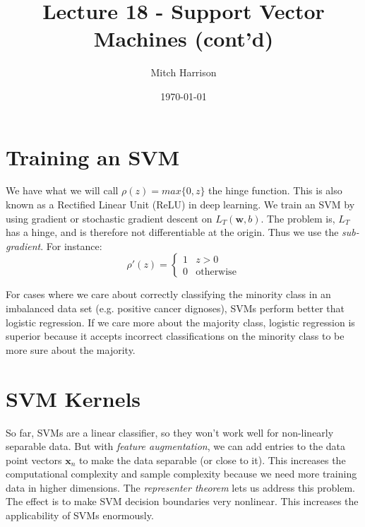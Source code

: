 \documentclass[titlepage, 12pt, leqno]{article}
\title{\Huge{Lecture 18 - Support Vector Machines (cont'd)}}
\author{\large{Mitch Harrison}}
\date{\today}
\begin{document}
\setlength{\parskip}{1\baselineskip}
\setlength{\parindent}{15pt}
\maketitle
\tableofcontents
\newpage


\section{Training an SVM}
We have what we will call $\rho(z) = max\{0,z\}$ the hinge function. This is also
known as a Rectified Linear Unit (ReLU) in deep learning. We train an SVM by
using gradient or stochastic gradient descent on $L_{T}(\textbf{w},b)$. The
problem is, $L_{T}$ has a hinge, and is therefore not differentiable at the
origin. Thus we use the \textit{sub-gradient}. For instance:
\[
\rho'(z) = 
\begin{cases}
    1 & z>0 \\
    0 & \text{otherwise}
\end{cases}
\]
\begin{note}
    For cases where we care about correctly classifying the minority class in
    an imbalanced data set (e.g. positive cancer dignoses), SVMs perform better
    that logistic regression. If we care more about the majority class,
    logistic regression is superior because it accepts incorrect classifications
    on the minority class to be more sure about the majority.
\end{note}

\pagebreak
\section{SVM Kernels}
So far, SVMs are a linear classifier, so they won't work well for non-linearly
separable data. But with \textit{feature augmentation}, we can add entries to
the data point vectors $\textbf{x}_{n}$ to make the data separable (or close 
to it). This increases the computational complexity and sample complexity 
because we need more training data in higher dimensions. The \textit{representer
theorem} lets us address this problem. The effect is to make SVM decision
boundaries very nonlinear. This increases the applicability of SVMs
enormously.
\end{document}
